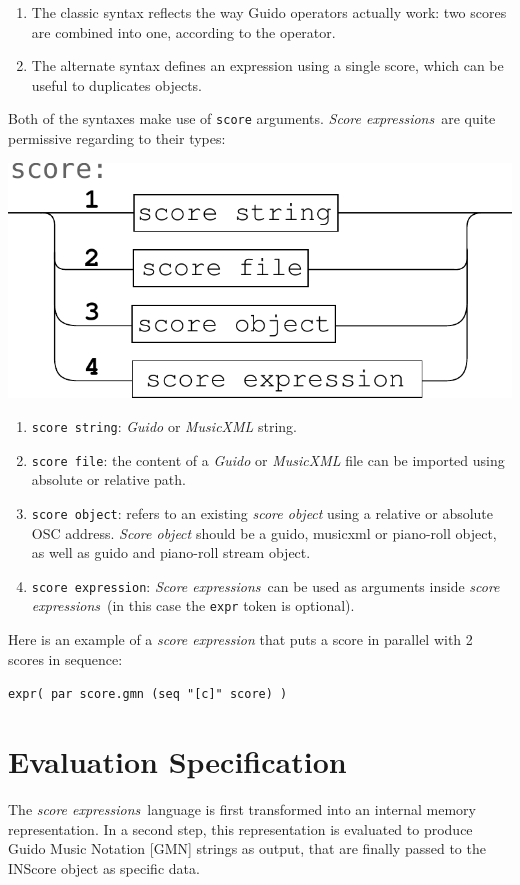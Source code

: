 \documentclass{article}
\newcommand{\OSC}[1]{\texttt{#1}}
\newcommand{\sExpr}{\emph{score expressions}}
\newcommand{\SExpr}{\emph{Score expressions}}
\newcommand{\sample}	[1]			{\vspace{-0.2em}\begin{center}\colorbox{mygrey}{\begin{minipage}[t]{0.95\columnwidth} {\small \texttt{#1}}\end{minipage}}\end{center}}
\begin{document}
\begin{enumerate}
\item The classic syntax reflects the way Guido operators actually work: two scores are combined into one, according to the operator.
\item The alternate syntax defines an expression using a single score, which can be useful to duplicates objects.
\end{enumerate}

\smallbreak

Both of the syntaxes make use of \OSC{score} arguments. \SExpr\ are quite permissive regarding to their types:
\begin{center}
\includegraphics[width=0.7\columnwidth]{imgs/syntax2}
\end{center}

\begin{enumerate}
\item \OSC{score string}: \emph{Guido} or \emph{MusicXML} string.
\item \OSC{score file}:  the content of a \emph{Guido} or \emph{MusicXML} file can be imported using absolute or relative path.
\item \OSC{score object}:  refers to an existing \emph{score object} using a relative or absolute OSC address. \emph{Score object} should be a guido, musicxml or piano-roll object, as well as guido and piano-roll stream object.
\item \OSC{score expression}:  \SExpr\ can be used as arguments inside \sExpr\ (in this case the \OSC{expr} token is optional).
\end{enumerate}

Here is an example of a \emph{score expression} that puts a score in parallel with 2 scores in sequence:
\sample{expr( par score.gmn (seq "[c]" score) )}


\section{Evaluation Specification}
\label{evaluationSpec}
The \sExpr\ language is first transformed into an internal memory representation. In a second step, this representation is evaluated to produce Guido Music Notation [GMN] \cite{hoos98} strings as output, that are finally passed to the INScore object as specific data.
\end{document}
